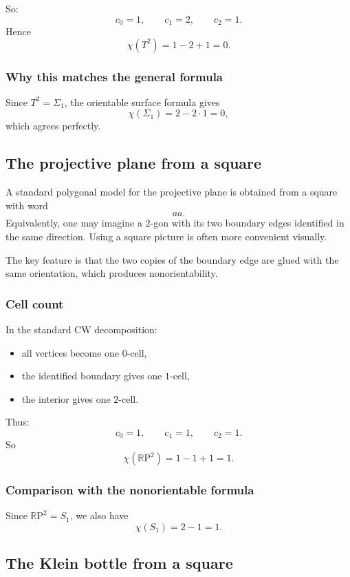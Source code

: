 \documentclass[12pt,a4paper]{article}
\newcommand{\RP}{\mathbb{R}\mathrm{P}}
\theoremstyle{notespace}
\begin{document}
So:
\[
c_0=1,\qquad c_1=2,\qquad c_2=1.
\]
Hence
\[
\chi(T^2)=1-2+1=0.
\]

\subsubsection*{Why this matches the general formula}

Since \(T^2=\Sigma_1\), the orientable surface formula gives
\[
\chi(\Sigma_1)=2-2\cdot 1=0,
\]
which agrees perfectly.

\subsection{The projective plane from a square}

A standard polygonal model for the projective plane is obtained from a square with word
\[
aa.
\]
Equivalently, one may imagine a \(2\)-gon with its two boundary edges identified in the same direction. Using a square picture is often more convenient visually.

The key feature is that the two copies of the boundary edge are glued with the same orientation, which produces nonorientability.

\subsubsection*{Cell count}

In the standard CW decomposition:
\begin{itemize}
	\item all vertices become one \(0\)-cell,
	\item the identified boundary gives one \(1\)-cell,
	\item the interior gives one \(2\)-cell.
\end{itemize}

Thus:
\[
c_0=1,\qquad c_1=1,\qquad c_2=1.
\]
So
\[
\chi(\RP^2)=1-1+1=1.
\]

\subsubsection*{Comparison with the nonorientable formula}

Since \(\RP^2=S_1\), we also have
\[
\chi(S_1)=2-1=1.
\]

\subsection{The Klein bottle from a square}
\end{document}
